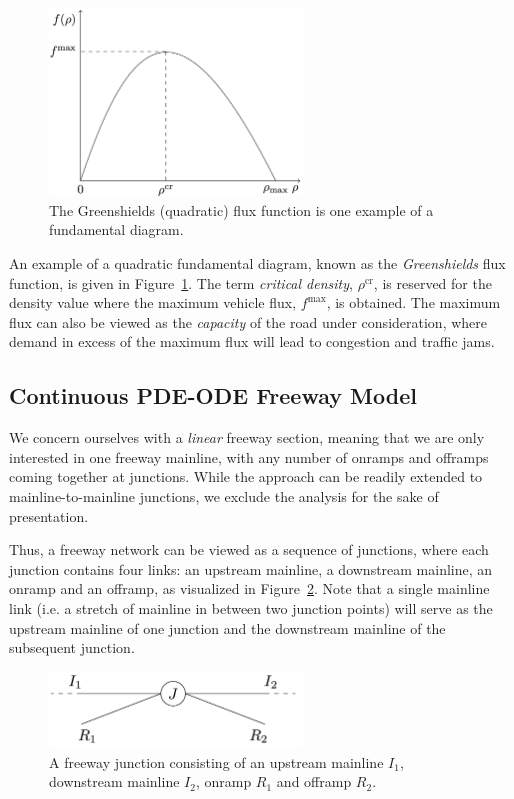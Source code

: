 \begin{figure}[htbp]
	\centering
	\includegraphics[width=0.6\textwidth]{diagrams/fd}
	\caption{The Greenshields (quadratic) flux function is one example of a fundamental diagram.}
	\label{fig:greenshields-fd}
\end{figure}

An example of a quadratic fundamental diagram, known as the \emph{Greenshields} flux function, is given in Figure~\ref{fig:greenshields-fd}. The term \emph{critical density}, $\rho^{\text{cr}}$, is reserved for the density value where the maximum vehicle flux, $f^{\max}$, is obtained. The maximum flux can also be viewed as the \emph{capacity} of the road under consideration, where demand in excess of the maximum flux will lead to congestion and traffic jams.

\subsection{Continuous PDE-ODE Freeway Model}
\label{sec:continuous-pde-ode-freeway-model}

We concern ourselves with a \emph{linear} freeway section, meaning that we are only interested in one freeway mainline, with any number of onramps and offramps coming together at junctions. While the approach can be readily extended to mainline-to-mainline junctions, we exclude the analysis for the sake of presentation.

Thus, a freeway network can be viewed as a sequence of junctions, where each junction contains four links: an upstream mainline, a downstream mainline, an onramp and an offramp, as visualized in Figure~\ref{fig:simple-junction}. Note that a single mainline link (i.e. a stretch of mainline in between two junction points) will serve as the upstream mainline of one junction and the downstream mainline of the subsequent junction.

\begin{figure}[htbp]
	\centering
	\includegraphics[width=0.6\textwidth]{diagrams/simple-junction}
	\caption{A freeway junction consisting of an upstream mainline $I_1$, downstream mainline $I_2$, onramp $R_1$ and offramp $R_2$.}
	\label{fig:simple-junction}
\end{figure}

